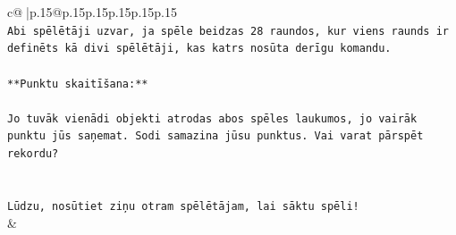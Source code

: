 \documentclass{article}
\begin{document}
{\begin{supertabular}{c@{$\;$}|p{.15\linewidth}@{}p{.15\linewidth}p{.15\linewidth}p{.15\linewidth}p{.15\linewidth}p{.15\linewidth}}
{{{\\ 
\texttt{Abi spēlētāji uzvar, ja spēle beidzas 28 raundos, kur viens raunds ir definēts kā divi spēlētāji, kas katrs nosūta derīgu komandu.} \\
\\ 
\texttt{**Punktu skaitīšana:**} \\
\\ 
\texttt{Jo tuvāk vienādi objekti atrodas abos spēles laukumos, jo vairāk punktu jūs saņemat. Sodi samazina jūsu punktus. Vai varat pārspēt rekordu?} \\
\\ 
\\ 
\texttt{Lūdzu, nosūtiet ziņu otram spēlētājam, lai sāktu spēli!} \\
            }
        }
    }
    & \\ \\


\end{supertabular}}
\end{document}
